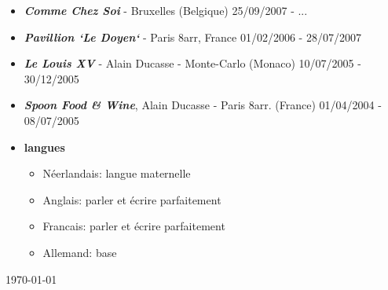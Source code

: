\documentclass[10pt]{report}
\begin{document}
{}

\begin{itemize}

\item \textbf{\emph{Comme Chez Soi}} - Bruxelles (Belgique)  \hfill 25/09/2007 - ...

\item \textbf{\emph{Pavillion `Le Doyen`}} - Paris 8arr, France  \hfill 01/02/2006 - 28/07/2007


\item \textbf{\emph{Le Louis XV}} - Alain Ducasse - Monte-Carlo (Monaco)  \hfill 10/07/2005 -  30/12/2005

\item \textbf{\emph{Spoon Food \& Wine}}, Alain Ducasse - Paris 8arr. (France)  \hfill 01/04/2004 - 08/07/2005
\end{itemize}


\begin{itemize}
\item \textbf{langues}
	\begin{itemize}
	\item N\'{e}erlandais: langue maternelle
	\item Anglais: parler et \'{e}crire parfaitement
	\item Francais: parler et \'{e}crire parfaitement
	\item Allemand: base
	\end{itemize}
	
\end{itemize}


 \par\nopagebreak\vfill\hfill \today
\end{document}
